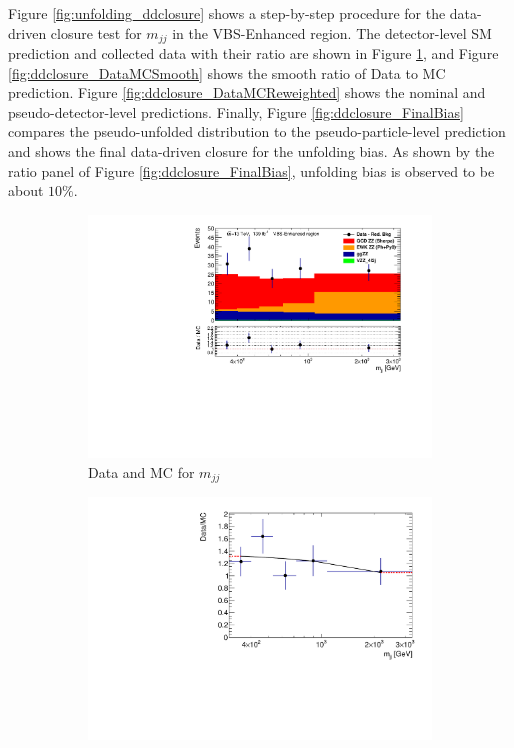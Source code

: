 Figure \ref{fig:unfolding_ddclosure} shows a step-by-step procedure for the data-driven closure test for $m_{jj}$ in the VBS-Enhanced region. The detector-level SM prediction and collected data with their ratio are shown in Figure \ref{fig:ddclosure_DataMC}, and Figure \ref{fig:ddclosure_DataMCSmooth} shows the smooth ratio of Data to MC prediction. Figure \ref{fig:ddclosure_DataMCReweighted} shows the nominal and pseudo-detector-level predictions. Finally, Figure \ref{fig:ddclosure_FinalBias} compares the pseudo-unfolded distribution to the pseudo-particle-level prediction and shows the final data-driven closure for the unfolding bias. As shown by the ratio panel of Figure \ref{fig:ddclosure_FinalBias}, unfolding bias is observed to be about $10\%$. 
\begin{figure}[htb]
    \centering
    \begin{subfigure}{.48\textwidth}
        \centering
        \includegraphics[width=.9\linewidth]{figures/Analysis/Unfolding/DDClosure_VBS_Enhanced_Ratio.pdf}
        \caption{ Data and MC for $m_{jj}$ \label{fig:ddclosure_DataMC}}
    \end{subfigure}
    \begin{subfigure}{.48\textwidth}
        \centering
        \includegraphics[width=.9\linewidth]{figures/Analysis/Unfolding/DDClosure_VBS_Enhanced_SmoothRatio.pdf}

\end{subfigure}
\end{figure}
